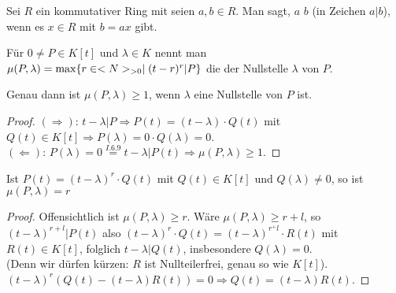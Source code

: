 \begin{definition}[$a$ teilt $b$]
	Sei $R$ ein kommutativer Ring mit seien $a,b\in R$. Man sagt, $a$  $b$ (in Zeichen $a\vert b$), wenn es $x\in R$ mit $b=ax$ gibt.
\end{definition}

\begin{definition}[Vielfachheit]
	Für $0\neq P\in K[t]$ und $\lambda\in K$ nennt man $\mu(P,\lambda)=\max\{r\in <N>_{>0}\mid (t-r)^r\vert P\}$ die  der Nullstelle $\lambda$ von $P$.
\end{definition}

\begin{lemma}
	Genau dann ist $\mu(P,\lambda)\ge 1$, wenn $\lambda$ eine Nullstelle von $P$ ist.
\end{lemma}
\begin{proof}
	$(\Rightarrow)$: $t-\lambda\vert P\Rightarrow P(t)=(t-\lambda)\cdot Q(t)$ mit $Q(t)\in K[t]\Rightarrow P(\lambda)=0\cdot Q(\lambda)=0$. \\
	$(\Leftarrow)$: $P(\lambda)=0\overset{I.6.9}{=}t-\lambda\vert P(t)\Rightarrow \mu(P,\lambda)\ge 1$.
\end{proof}

\begin{lemma}
	Ist $P(t)=(t-\lambda)^r\cdot Q(t)$ mit $Q(t)\in K[t]$ und $Q(\lambda)\neq 0$, so ist $\mu(P,\lambda)=r$
\end{lemma}
\begin{proof}
	Offensichtlich ist $\mu(P,\lambda)\ge r$. Wäre $\mu(P,\lambda)\ge r+l$, so $(t-\lambda)^{r+l}\vert P(t)$ also $(t-\lambda)^r\cdot Q(t)=(t-\lambda)^{r^+l}\cdot R(t)$ mit $R(t)\in K[t]$, folglich $t-\lambda\vert Q(t)$, insbesondere $Q(\lambda)=0$. \\
	(Denn wir dürfen kürzen: $R$ ist Nullteilerfrei, genau so wie $K[t]$). \\
	$(t-\lambda)^r(Q(t)-(t-\lambda)R(t))=0\Rightarrow Q(t)=(t-\lambda)R(t)$.
\end{proof}